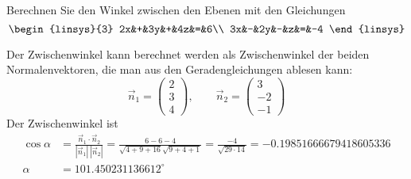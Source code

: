 Berechnen Sie den Winkel zwischen den Ebenen mit den Gleichungen
\[
\begin{linsys}{3}
2x&+&3y&+&4z&=&6\\
3x&-&2y&-&z&=&-4
\end{linsys}
\]

\begin{loesung}
Der Zwischenwinkel kann berechnet werden als Zwischenwinkel der
beiden Normalenvektoren, die man aus den Geradengleichungen
ablesen kann:
$$
\vec n_1=\begin{pmatrix}2\\3\\4\end{pmatrix},\qquad
\vec n_2=\begin{pmatrix}3\\-2\\-1\end{pmatrix}
$$
Der Zwischenwinkel ist
\begin{align*}
\cos\alpha&=\frac{\vec n_1\cdot\vec n_2}{|\vec n_1|\,|\vec n_2|}=\frac{6-6-4}{\sqrt{4+9+16}\sqrt{9+4+1}}
=\frac{-4}{\sqrt{29\cdot14}}=-0.19851666679418605336
\\
\alpha&=101.450231136612^\circ
\end{align*}
\end{loesung}


